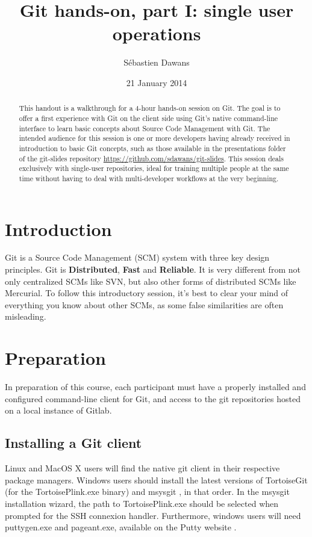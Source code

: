 \documentclass{../common/tufte-latex/tufte-handout}
\title{Git hands-on, part I: single user operations}
\author{S\'ebastien Dawans}
\date{21 January 2014} %
\begin{document}
\maketitle%

\begin{abstract}
\noindent
This handout is a walkthrough for a 4-hour hands-on session on Git.
The goal is to offer a first experience with Git on the client side using Git's native command-line interface to learn basic concepts about Source Code Management with Git.
The intended audience for this session is one or more developers having already received in introduction to basic Git concepts, such as those available in the presentations folder of the git-slides repository \url{https://github.com/sdawans/git-slides}.
This session deals exclusively with single-user repositories, ideal for training multiple people at the same time without having to deal with multi-developer workflows at the very beginning.
\end{abstract}


\section{Introduction}\label{sec:intro}

Git is a Source Code Management (SCM) system with three key design principles.
Git is \textbf{Distributed}, \textbf{Fast} and \textbf{Reliable}.
It is very different from not only centralized SCMs like SVN, but also other forms of distributed SCMs like Mercurial.
To follow this introductory session, it's best to clear your mind of everything you know about other SCMs, as some false similarities are often misleading.

\section{Preparation}

In preparation of this course, each participant must have a properly installed and configured command-line client for Git, and access to the git repositories hosted on a local instance of Gitlab.

\subsection{Installing a Git client}\label{sec:preparation}

Linux and MacOS X users will find the native git client in their respective package managers.
Windows users should install the latest versions of TortoiseGit  (for the TortoisePlink.exe binary) and msysgit , in that order.
In the msysgit installation wizard, the path to TortoisePlink.exe should be selected when prompted for the SSH connexion handler.
Furthermore, windows users will need puttygen.exe and pageant.exe, available on the Putty website .
\end{document}
